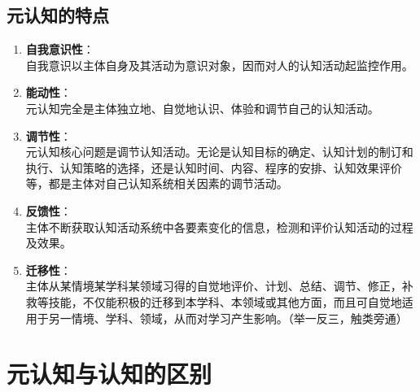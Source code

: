 \subsection*{元认知的特点}
\begin{enumerate}
    \item \textbf{自我意识性}：\\
    自我意识以主体自身及其活动为意识对象，因而对人的认知活动起监控作用。
    
    \item \textbf{能动性}：\\
    元认知完全是主体独立地、自觉地认识、体验和调节自己的认知活动。
    
    \item \textbf{调节性}：\\
    元认知核心问题是调节认知活动。无论是认知目标的确定、认知计划的制订和执行、认知策略的选择，还是认知时间、内容、程序的安排、认知效果评价等，都是主体对自己认知系统相关因素的调节活动。
    
    \item \textbf{反馈性}：\\
    主体不断获取认知活动系统中各要素变化的信息，检测和评价认知活动的过程及效果。
    
    \item \textbf{迁移性}：\\
    主体从某情境某学科某领域习得的自觉地评价、计划、总结、调节、修正，补救等技能，不仅能积极的迁移到本学科、本领域或其他方面，而且可自觉地适用于另一情境、学科、领域，从而对学习产生影响。（举一反三，触类旁通）
\end{enumerate}

\clearpage

\section{元认知与认知的区别}

